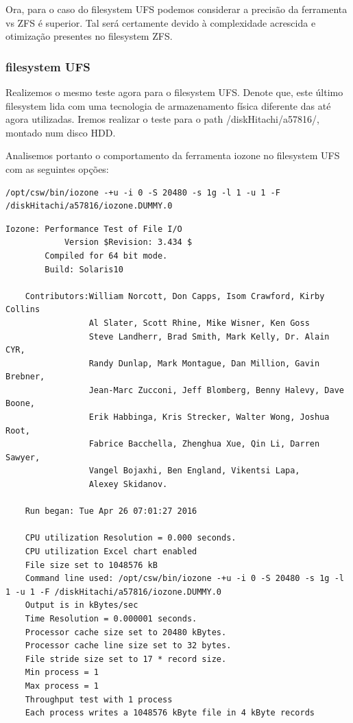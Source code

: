 \documentclass[a4paper]{article}
\begin{document}
{Ora, para o caso do filesystem UFS podemos considerar a precisão da ferramenta vs ZFS é superior. Tal será certamente devido à complexidade acrescida e otimização presentes no filesystem ZFS. 


\subsubsection{filesystem UFS}
Realizemos o mesmo teste agora para o filesystem UFS. Denote que, este último filesystem lida com uma tecnologia de armazenamento física diferente das até agora utilizadas. Iremos realizar o teste para o path /diskHitachi/a57816/, montado num disco HDD.\par 
Analisemos portanto o comportamento da ferramenta iozone no filesystem UFS com as seguintes opções:

\begin{lstlisting}[style=command]
/opt/csw/bin/iozone -+u -i 0 -S 20480 -s 1g -l 1 -u 1 -F /diskHitachi/a57816/iozone.DUMMY.0
\end{lstlisting}


\begin{lstlisting}[style=output]
	Iozone: Performance Test of File I/O
	        Version $Revision: 3.434 $
		Compiled for 64 bit mode.
		Build: Solaris10 

	Contributors:William Norcott, Don Capps, Isom Crawford, Kirby Collins
	             Al Slater, Scott Rhine, Mike Wisner, Ken Goss
	             Steve Landherr, Brad Smith, Mark Kelly, Dr. Alain CYR,
	             Randy Dunlap, Mark Montague, Dan Million, Gavin Brebner,
	             Jean-Marc Zucconi, Jeff Blomberg, Benny Halevy, Dave Boone,
	             Erik Habbinga, Kris Strecker, Walter Wong, Joshua Root,
	             Fabrice Bacchella, Zhenghua Xue, Qin Li, Darren Sawyer,
	             Vangel Bojaxhi, Ben England, Vikentsi Lapa,
	             Alexey Skidanov.

	Run began: Tue Apr 26 07:01:27 2016

	CPU utilization Resolution = 0.000 seconds.
	CPU utilization Excel chart enabled
	File size set to 1048576 kB
	Command line used: /opt/csw/bin/iozone -+u -i 0 -S 20480 -s 1g -l 1 -u 1 -F /diskHitachi/a57816/iozone.DUMMY.0
	Output is in kBytes/sec
	Time Resolution = 0.000001 seconds.
	Processor cache size set to 20480 kBytes.
	Processor cache line size set to 32 bytes.
	File stride size set to 17 * record size.
	Min process = 1 
	Max process = 1 
	Throughput test with 1 process
	Each process writes a 1048576 kByte file in 4 kByte records


\end{lstlisting}}
\end{document}
